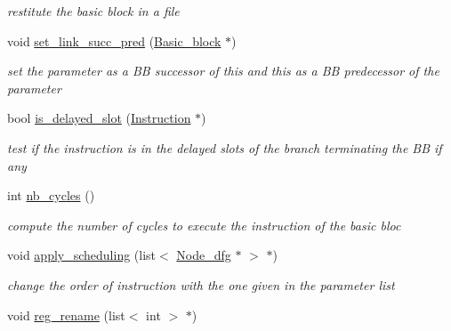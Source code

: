 \begin{DoxyCompactItemize}
\begin{DoxyCompactList}\small\item\em restitute the basic block in a file \end{DoxyCompactList}\item 
\hypertarget{class_basic__block_acb9b80088751bcf4329b3d1532f724ac}{void \hyperlink{class_basic__block_acb9b80088751bcf4329b3d1532f724ac}{set\+\_\+link\+\_\+succ\+\_\+pred} (\hyperlink{class_basic__block}{Basic\+\_\+block} $\ast$)}\label{class_basic__block_acb9b80088751bcf4329b3d1532f724ac}

\begin{DoxyCompactList}\small\item\em set the parameter as a B\+B successor of this and this as a B\+B predecessor of the parameter \end{DoxyCompactList}\item 
\hypertarget{class_basic__block_ad156275e42428ee703ffa0aa3e8b5bb0}{bool \hyperlink{class_basic__block_ad156275e42428ee703ffa0aa3e8b5bb0}{is\+\_\+delayed\+\_\+slot} (\hyperlink{class_instruction}{Instruction} $\ast$)}\label{class_basic__block_ad156275e42428ee703ffa0aa3e8b5bb0}

\begin{DoxyCompactList}\small\item\em test if the instruction is in the delayed slots of the branch terminating the B\+B if any \end{DoxyCompactList}\item 
\hypertarget{class_basic__block_a0a9caa9a904adc7807e390308e7b939c}{int \hyperlink{class_basic__block_a0a9caa9a904adc7807e390308e7b939c}{nb\+\_\+cycles} ()}\label{class_basic__block_a0a9caa9a904adc7807e390308e7b939c}

\begin{DoxyCompactList}\small\item\em compute the number of cycles to execute the instruction of the basic bloc \end{DoxyCompactList}\item 
void \hyperlink{class_basic__block_a2dd5a0cf5a891f5626cd7b34849ea081}{apply\+\_\+scheduling} (list$<$ \hyperlink{class_node__dfg}{Node\+\_\+dfg} $\ast$ $>$ $\ast$)
\begin{DoxyCompactList}\small\item\em change the order of instruction with the one given in the parameter list \end{DoxyCompactList}\item 
\hypertarget{class_basic__block_a800a558f4a20dfbd8528608b0fca3854}{void \hyperlink{class_basic__block_a800a558f4a20dfbd8528608b0fca3854}{reg\+\_\+rename} (list$<$ int $>$ $\ast$)}\label{class_basic__block_a800a558f4a20dfbd8528608b0fca3854}


\end{DoxyCompactItemize}
